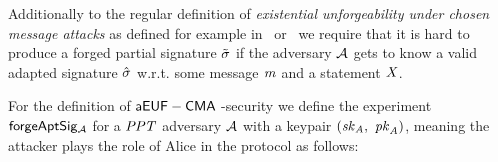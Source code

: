 Additionally to the regular definition of \emph{existential unforgeability under chosen message attacks} as defined for example in~\cite{lindell2017fast} or~\cite{vaudenay2006classical} we require that it is hard to produce a forged partial signature $\tilde{\sigma}$ if the
adversary $\mathcal{A}$ gets to know a valid adapted signature $\hat{\sigma}$ w.r.t. some message $\mathit{m}$ and a statement $\mathit{X}$.
\begin{definition}[$\cnstaEUFCMA$] \label{def:aeufcma}

    For the definition of $\cnstaEUFCMA$-security we define the experiment $\mathsf{forgeAptSig_{\mathcal{A}}}$ for a $\mathit{PPT}$ adversary $\mathcal{A}$ with a keypair $(\mathit{sk}_{\mathit{A}} ,~ \mathit{pk}_{\mathit{A}})$,
    meaning the attacker plays the role of Alice in the protocol as
    follows:


\end{definition}
